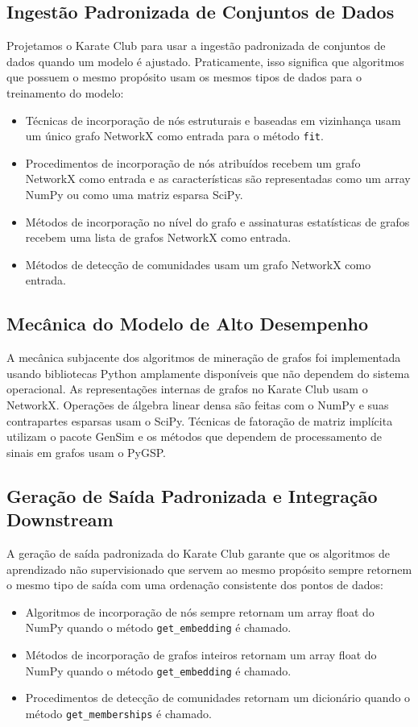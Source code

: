 \documentclass[sigconf]{acmart}
\begin{document}
\subsection{Ingestão Padronizada de Conjuntos de Dados}

Projetamos o Karate Club para usar a ingestão padronizada de conjuntos de dados quando um modelo é ajustado. Praticamente, isso significa que algoritmos que possuem o mesmo propósito usam os mesmos tipos de dados para o treinamento do modelo:
\begin{itemize}
    \item Técnicas de incorporação de nós estruturais e baseadas em vizinhança usam um único grafo NetworkX como entrada para o método \texttt{fit}.
    \item Procedimentos de incorporação de nós atribuídos recebem um grafo NetworkX como entrada e as características são representadas como um array NumPy ou como uma matriz esparsa SciPy.
    \item Métodos de incorporação no nível do grafo e assinaturas estatísticas de grafos recebem uma lista de grafos NetworkX como entrada.
    \item Métodos de detecção de comunidades usam um grafo NetworkX como entrada.
\end{itemize}

\subsection{Mecânica do Modelo de Alto Desempenho}

A mecânica subjacente dos algoritmos de mineração de grafos foi implementada usando bibliotecas Python amplamente disponíveis que não dependem do sistema operacional. As representações internas de grafos no Karate Club usam o NetworkX. Operações de álgebra linear densa são feitas com o NumPy e suas contrapartes esparsas usam o SciPy. Técnicas de fatoração de matriz implícita utilizam o pacote GenSim e os métodos que dependem de processamento de sinais em grafos usam o PyGSP.

\subsection{Geração de Saída Padronizada e Integração Downstream}

A geração de saída padronizada do Karate Club garante que os algoritmos de aprendizado não supervisionado que servem ao mesmo propósito sempre retornem o mesmo tipo de saída com uma ordenação consistente dos pontos de dados:
\begin{itemize}
    \item Algoritmos de incorporação de nós sempre retornam um array float do NumPy quando o método \texttt{get\_embedding} é chamado.
    \item Métodos de incorporação de grafos inteiros retornam um array float do NumPy quando o método \texttt{get\_embedding} é chamado.
    \item Procedimentos de detecção de comunidades retornam um dicionário quando o método \texttt{get\_memberships} é chamado.
\end{itemize}
\end{document}
